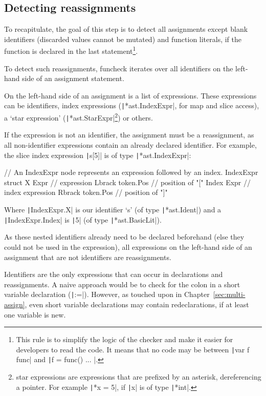 \subsection{Detecting reassignments}

To recapitulate, the goal of this step is to detect all assignments except blank identifiers
(discarded values cannot be mutated) and function literals, if the function is declared in the
last statement\footnote{This rule is to simplify the logic of the checker and make it easier
    for developers to read the code. It means that no code may be between \texttt|var f func|
and \texttt|f = func() { ... }|.}.

To detect such reassignments, funcheck iterates over all identifiers on the left-hand side
of an assignment statement.

On the left-hand side of an assignment is a list of expressions. These expressions can be
identifiers, index expressions (\texttt|*ast.IndexExpr|, for map and slice access),
a `star expression' (\texttt|*ast.StarExpr|\footnote{star expressions
    are expressions that are prefixed by an asterisk, dereferencing a pointer. For example
\texttt|*x = 5|, if \texttt|x| is of type \texttt|*int|.}) or others.

If the expression is not an identifier, the assignment must be a reassignment, as all non-identifier
expressions contain an already declared identifier. For example, the slice index expression
\texttt|s[5]| is of type \texttt|*ast.IndexExpr|:
\begin{gocode}
// An IndexExpr node represents an expression followed by an index.
IndexExpr struct {
	X      Expr      // expression
	Lbrack token.Pos // position of "["
	Index  Expr      // index expression
	Rbrack token.Pos // position of "]"
}
\end{gocode}

Where \texttt|IndexExpr.X| is our identifier `s' (of type \texttt|*ast.Ident|)
and a \texttt|IndexExpr.Index| is \texttt|5| (of type \texttt|*ast.BasicLit|).

As these nested identifiers already need to be declared beforehand (else they could not be used
in the expression), all expressions on the left-hand side of an assignment that are not identifiers
are reassignments.

Identifiers are the only expressions that can occur in declarations and reassignments. A naive
approach would be to check for the colon in a short variable declaration (\texttt|:=|).
However, as touched upon in Chapter~\ref{sec:multi-assign}, even short variable declarations may
contain redeclarations, if at least one variable is new.

